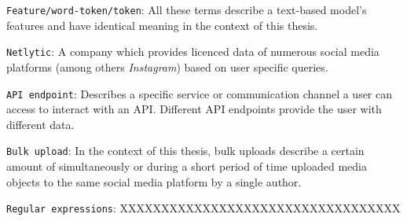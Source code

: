 \texttt{Feature/word-token/token}: All these terms describe a text-based model's features and have identical meaning in the context of this thesis.\newline

\texttt{Netlytic}: A company which provides licenced data of numerous social media platforms (among others \textit{Instagram}) based on user specific queries.\newline

\texttt{API endpoint}: Describes a specific service or communication channel a user can access to interact with an API. Different API endpoints provide the user with different data.\newline

\texttt{Bulk upload}: In the context of this thesis, bulk uploads describe a certain amount of simultaneously or during a short period of time uploaded media objects to the same social media platform by a single author.\newline

\texttt{Regular expressions}: XXXXXXXXXXXXXXXXXXXXXXXXXXXXXXXXXX




 \cleardoublepage

